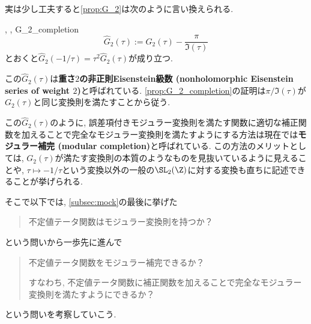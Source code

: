 \documentclass[11pt,b5paper,oneside,lualatex]{ltjsarticle} %
\numberwithin{equation}{section} %
\begin{document}
実は少し工夫すると\cref{prop:G_2}は次のように言い換えられる. 

\begin{prop}{{\cite[Exercise 1.2.8(d)]{DS}, \cite[pp.~19]{1-2-3}, %
			\cite[Lemma 6.2]{BFOR}}}{G_2_completion}
	\[
	\widehat{G}_2 (\tau) := G_2(\tau) - \frac{\pi }{\Im (\tau)}
	\]
	とおくと$ \widehat{G}_2 (-1/\tau) = \tau^2 \widehat{G}_2 (\tau) $が成り立つ.
\end{prop}

この$ \widehat{G}_2 (\tau) $は\textbf{重さ$ 2 $の非正則Eisenstein級数 (nonholomorphic Eisenstein series of weight $ 2 $)}と呼ばれている. 
\cref{prop:G_2_completion}の証明は$ \pi / \Im (\tau) $が$ G_2(\tau) $と同じ変換則を満たすことから従う. 

この$ \widehat{G}_2 (\tau) $のように, 誤差項付きモジュラー変換則を満たす関数に適切な補正関数を加えることで完全なモジュラー変換則を満たすようにする方法は現在では\textbf{モジュラー補完 (modular completion)}と呼ばれている. 
この方法のメリットとしては, $ G_2(\tau) $が満たす変換則の本質のようなものを見抜いているように見えることや, $ \tau \mapsto -1/\tau $という変換以外の一般の$ \SL_2(\Z) $に対する変換も直ちに記述できることが挙げられる. 

そこで以下では, \cref{subsec:mock}の最後に挙げた
\begin{quote}
	\centering
	不定値テータ関数はモジュラー変換則を持つか？
\end{quote}
という問いから一歩先に進んで
\begin{quote}
	\centering
	不定値テータ関数をモジュラー補完できるか？
	
	すなわち, 不定値テータ関数に補正関数を加えることで完全なモジュラー変換則を満たすようにできるか？
\end{quote}
という問いを考察していこう. 
\end{document}
